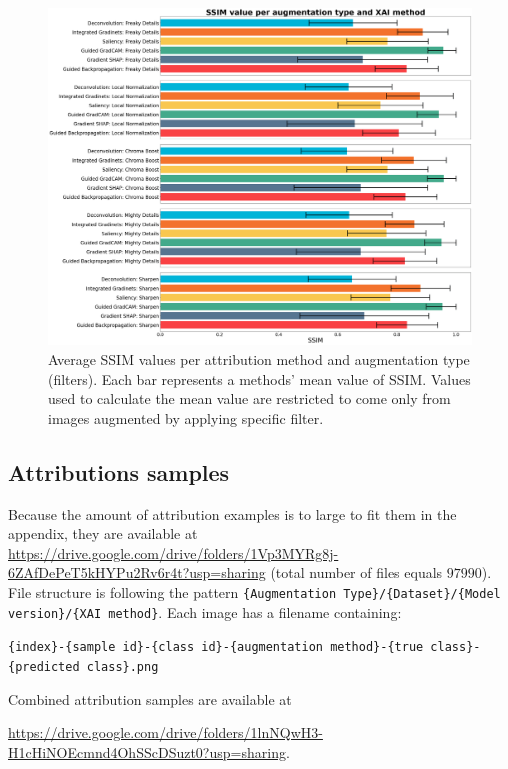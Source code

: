 \begin{figure}[ht]
  \centering
  \includegraphics[width=\textwidth]{appendixes/images/filters-ssim.png}
  \caption{Average SSIM values per attribution method and augmentation type (filters). Each bar represents a methods' mean value of SSIM. Values used to calculate the mean value are restricted to come only from images augmented by applying specific filter.}\label{fig:SSIM-all-filters}
\end{figure}

\FloatBarrier

\subsection{Attributions samples}\label{appendix:attribution-samples}

Because the amount of attribution examples is to large to fit them in the appendix, they are available at \url{https://drive.google.com/drive/folders/1Vp3MYRg8j-6ZAfDePeT5kHYPu2Rv6r4t?usp=sharing} (total number of files equals $97990$). File structure is following the pattern \verb|{Augmentation Type}/{Dataset}/{Model version}/{XAI method}|. Each image has a filename containing:

\verb|{index}-{sample id}-{class id}-{augmentation method}-{true class}-{predicted class}.png|

\vspace{5mm}

Combined attribution samples are available at

\url{https://drive.google.com/drive/folders/1lnNQwH3-H1cHiNOEcmnd4OhSScDSuzt0?usp=sharing}.

